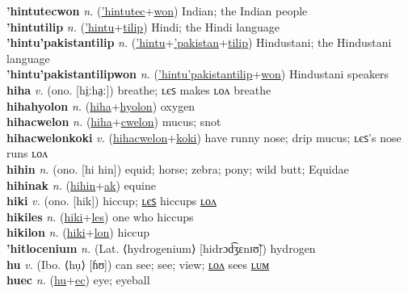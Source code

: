 \textbf{'hintutecwon} \textit{n.} (\hyperref['hintutec]{'hintutec}+\hyperref[won]{won})
Indian; the Indian people \label{'hintutecwon} \\
\textbf{'hintutilip} \textit{n.} (\hyperref['hintu]{'hintu}+\hyperref[tilip]{tilip})
Hindi; the Hindi language \label{'hintutilip} \\
\textbf{'hintu'pakistantilip} \textit{n.} (\hyperref['hintu]{'hintu}+\hyperref['pakistan]{'pakistan}+\hyperref[tilip]{tilip})
Hindustani; the Hindustani language \label{'hintu'pakistantilip} \\
\textbf{'hintu'pakistantilipwon} \textit{n.} (\hyperref['hintu'pakistantilip]{'hintu'pakistantilip}+\hyperref[won]{won})
Hindustani speakers \label{'hintu'pakistantilipwon} \\
\textbf{hiha} \textit{v.} (ono. [hi̤ːha̤ː])
breathe; ʟєꜱ makes ʟᴏᴧ breathe \label{hiha} \\
\textbf{hihahyolon} \textit{n.} (\hyperref[hiha]{hiha}+\hyperref[hyolon]{hyolon})
oxygen \label{hihahyolon} \\
\textbf{hihacwelon} \textit{n.} (\hyperref[hiha]{hiha}+\hyperref[cwelon]{cwelon})
mucus; snot \label{hihacwelon} \\
\textbf{hihacwelonkoki} \textit{v.} (\hyperref[hihacwelon]{hihacwelon}+\hyperref[koki]{koki})
have runny nose; drip mucus; ʟєꜱ's nose runs ʟᴏᴧ \label{hihacwelonkoki} \\
\textbf{hihin} \textit{n.} (ono. [hi hin])
equid; horse; zebra; pony; wild butt; Equidae \label{hihin} \\
\textbf{hihinak} \textit{n.} (\hyperref[hihin]{hihin}+\hyperref[ak]{ak})
equine \label{hihinak} \\
\textbf{hiki} \textit{v.} (ono. [hik])
hiccup; \hyperref[hikiles]{ʟєꜱ} hiccups \hyperref[hikilon]{ʟᴏᴧ} \label{hiki} \\
\textbf{hikiles} \textit{n.} (\hyperref[hiki]{hiki}+\hyperref[les]{les})
one who hiccups \label{hikiles} \\
\textbf{hikilon} \textit{n.} (\hyperref[hiki]{hiki}+\hyperref[lon]{lon})
hiccup \label{hikilon} \\
\textbf{'hitlocenium} \textit{n.} (Lat. ⟨hydrogenium⟩ [hidrɔd͡ʒɛnɪʊ̃])
hydrogen \label{'hitlocenium} \\
\textbf{hu} \textit{v.} (Ibo. ⟨hụ⟩ [ɦʊ])
can see; see; view; \hyperref[hulon]{ʟᴏᴧ} sees \hyperref[hulum]{ʟᴜᴍ} \label{hu} \\
\textbf{huec} \textit{n.} (\hyperref[hu]{hu}+\hyperref[ec]{ec})
eye; eyeball \label{huec} \\
